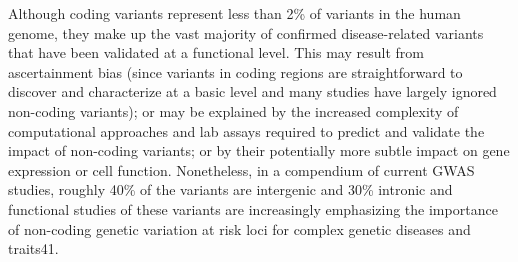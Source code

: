 Although coding variants represent less than 2\% of variants in the human genome, they make up the vast majority of confirmed disease-related variants that have been validated at a functional level. This may result from ascertainment bias (since variants in coding regions are straightforward to discover and characterize at a basic level and many studies have largely ignored non-coding variants); or may be explained by the increased complexity of computational approaches and lab assays required to predict and validate the impact of non-coding variants; or by their potentially more subtle impact on gene expression or cell function. Nonetheless, in a compendium of current GWAS studies, roughly 40\% of the variants are intergenic and 30\% intronic and functional studies of these variants are increasingly emphasizing the importance of non-coding genetic variation at risk loci for complex genetic diseases and traits41.

